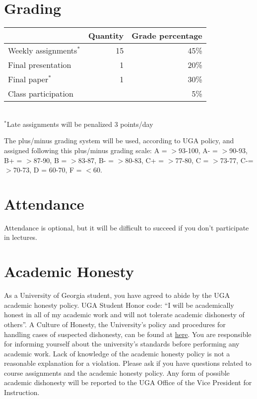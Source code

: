 \documentclass[12pt]{article}
\begin{document}
  

\vspace{-2mm}
\section*{\normalsize Grading}
\vspace{-4mm}
\begin{center}
  \begin{tabular}[h!]{lrr}
    \hline
                           & Quantity & Grade percentage         \\
    \hline
    Weekly assignments$^*$ & 15       & 45\%                     \\
    Final presentation     & 1        & 20\%                     \\
    Final paper$^{*}$      & 1        & 30\%                     \\
    Class participation    &          & 5\%                      \\
    \hline
  \end{tabular}                                                  \\
  \small
\hspace{0mm} $^*$Late assignments will be penalized 3 points/day \\ 
\end{center}
The plus/minus grading system will be used, according to UGA policy,
and assigned following this plus/minus grading scale: A = $>$93-100,
A- = $>$90-93, B+ = $>$87-90, B = $>$83-87, B- = $>$80-83, C+ = $>$77-80,
C = $>$73-77, C-= $>$70-73, D = 60-70, F = $<$60. 


\vspace{-2mm}
\section*{\normalsize Attendance}
\vspace{-4mm}
Attendance is optional, but it will be difficult to succeed if you don't participate in lectures. 



\vspace{-2mm}
\section*{\normalsize Academic Honesty}
\vspace{-4mm}
As a University of Georgia student, you have agreed to abide by the
UGA academic honesty policy. UGA Student Honor code: ``I will be
academically honest in all of my academic work and will not tolerate
academic dishonesty of others''. A Culture of Honesty, the University's
policy and procedures for handling cases of suspected dishonesty, can
be found at \href{https://honesty.uga.edu/}{here}. You are responsible for
informing yourself about the university’s standards before performing
any academic work. Lack of knowledge of the academic honesty policy is
not a reasonable explanation for a violation. Please ask if you have
questions related to course assignments and the academic honesty
policy. Any form of possible academic dishonesty will be reported to
the UGA Office of the Vice President for Instruction.
\end{document}
